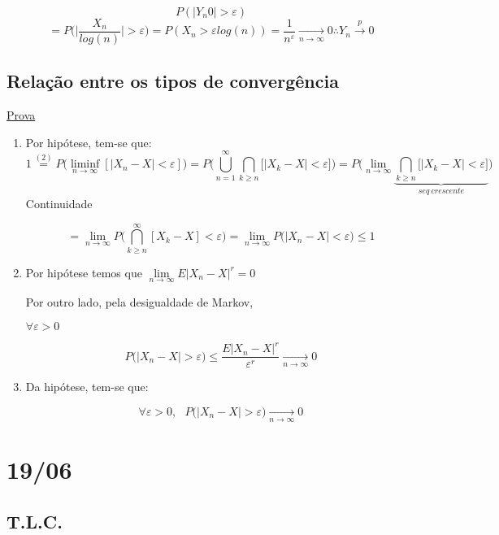 \documentclass[a4paper,12pt]{article}
\begin{document}
$$P(|Y_n0|>\varepsilon) $$
$$= P\bigg(
\bigg|
\frac{X_n}{log(n)}
\bigg|>\varepsilon
\bigg) = P(X_n > \varepsilon log(n)) = \frac{1}{n^\varepsilon} \underset{n\rightarrow \infty}{\longrightarrow}0
\therefore Y_n \overset{p}{\longrightarrow} 0 
 $$

\newpage 


\subsection{Relação entre os tipos de convergência}

\underline{Prova}
\begin{enumerate}[label=\roman*)]
	\item Por hipótese, tem-se que:
	$$ 1
	\overset{(2)}{=}  P\bigg(
	\liminf\limits_{n\rightarrow \infty} [|X_n-X|<\varepsilon]
	\bigg)=P\bigg(
	 \bigcup\limits_{n=1}^\infty \bigcap\limits_{k\ge n} \bigg[
	|X_k-X|<\varepsilon
	\bigg]
	\bigg)
	=
	P\bigg(
	\lim\limits_{n\rightarrow \infty} \underbrace{\bigcap_{k\ge n}\bigg[
	|X_k-X|<\varepsilon
	\bigg]}_{seq \ crescente}
	\bigg)
	$$
	Continuidade 
	
	$$= \lim\limits_{n\rightarrow \infty} P\bigg(
	\bigcap\limits_{k\ge n}^\infty [X_k-X]<\varepsilon
	\bigg)= \lim\limits_{n\rightarrow \infty}  P\bigg(
	|X_n-X|<\varepsilon
	\bigg) \le 1$$
	
	\item Por  hipótese temos que $ \lim\limits_{n\rightarrow \infty} E|X_n-X|^r = 0$
	
	Por outro lado, pela desigualdade de Markov,
	
	$\forall \varepsilon > 0$
	
	$$P\bigg(
	|X_n-X|>\varepsilon
	\bigg)\le \frac{E|X_n-X|^r}{\varepsilon^r}  \underset{n\rightarrow\infty}{\longrightarrow} 0$$
	
	\item Da hipótese, tem-se que:
	
	$$\forall \varepsilon>0, \ \ \ P\bigg(
	|X_n-X| >\varepsilon
	\bigg) \underset{n\rightarrow\infty}{\longrightarrow} 0 $$
\end{enumerate}

\newpage 

\section{19/06 }
\subsection{T.L.C.}
\end{document}
